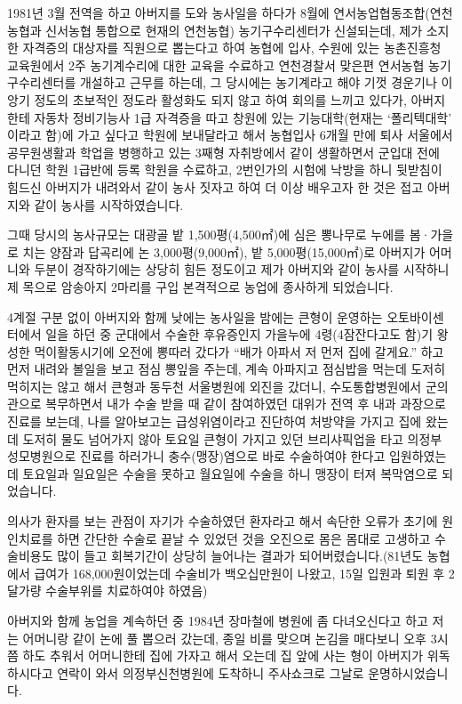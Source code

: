 \documentclass[chapter,book,openany,twoside]{oblivoir}
\begin{document}
1981년 3월 전역을 하고 아버지를 도와 농사일을 하다가 8월에 연서농업협동조합(연천농협과 신서농협 통합으로 현재의 연천농협) 농기구수리센터가 신설되는데, 제가 소지한 자격증의 대상자를 직원으로 뽑는다고 하여 농협에 입사, 수원에 있는 농촌진흥청 교육원에서 2주 농기계수리에 대한 교육을 수료하고 연천경찰서 맞은편 연서농협 농기구수리센터를 개설하고 근무를 하는데, 그 당시에는 농기계라고 해야 기껏 경운기나 이앙기 정도의 초보적인 정도라 활성화도 되지 않고 하여 회의를 느끼고 있다가, 아버지한테 자동차 정비기능사 1급 자격증을 따고 창원에 있는 기능대학(현재는 `폴리텍대학' 이라고 함)에 가고 싶다고 학원에 보내달라고 해서 농협입사 6개월 만에 퇴사 서울에서 공무원생활과 학업을 병행하고 있는 3째형 자취방에서 같이 생활하면서 군입대 전에 다니던 학원 1급반에 등록 학원을 수료하고, 2번인가의 시험에 낙방을 하니 뒷받침이 힘드신 아버지가 내려와서 같이 농사 짓자고 하여 더 이상 배우고자 한 것은 접고 아버지와 같이 농사를 시작하였습니다.

그때 당시의 농사규모는 대광골 밭 1,500평(4,500㎡)에 심은 뽕나무로 누에를 봄·가을로 치는 양잠과 답곡리에 논 3,000평(9,000㎡), 밭 5,000평(15,000㎡)로 아버지가 어머니와 두분이 경작하기에는 상당히 힘든 정도이고 제가 아버지와 같이 농사를 시작하니 제 목으로 암송아지 2마리를 구입 본격적으로 농업에 종사하게 되었습니다.

4계절 구분 없이 아버지와 함께 낮에는 농사일을 밤에는 큰형이 운영하는 오토바이센터에서 일을 하던 중 군대에서 수술한 후유증인지 가을누에 4령(4잠잔다고도 함)기  왕성한 먹이활동시기에 오전에 뽕따러 갔다가 ``배가 아파서 저 먼저 집에 갈게요.'' 하고 먼저 내려와 볼일을 보고 점심 뽕잎을 주는데, 계속 아파지고 점심밥을 먹는데 도저히 먹히지는 않고 해서 큰형과 동두천 서울병원에 외진을 갔더니, 수도통합병원에서 군의관으로 복무하면서 내가 수술 받을 때 같이 참여하였던 대위가 전역 후 내과 과장으로 진료를 보는데, 나를 알아보고는 급성위염이라고 진단하여 처방약을 가지고 집에 왔는데 도저히 물도 넘어가지 않아 토요일 큰형이 가지고 있던 브리샤픽업을 타고 의정부 성모병원으로 진료를 하러가니 충수(맹장)염으로 바로 수술하여야 한다고 입원하였는데 토요일과 일요일은 수술을 못하고 월요일에 수술을 하니 맹장이 터져 복막염으로 되었습니다.

의사가 환자를 보는 관점이 자기가 수술하였던 환자라고 해서 속단한 오류가 초기에 원인치료를 하면 간단한 수술로 끝날 수 있었던 것을 오진으로 몸은 몸대로 고생하고 수술비용도 많이 들고 회복기간이 상당히 늘어나는 결과가 되어버렸습니다.(81년도 농협에서 급여가 168,000원이었는데 수술비가 백오십만원이 나왔고, 15일 입원과 퇴원 후 2달가량 수술부위를 치료하여야 하였음)

아버지와 함께 농업을 계속하던 중 1984년 장마철에 병원에 좀 다녀오신다고 하고 저는 어머니랑 같이 논에 풀 뽑으러 갔는데, 종일 비를 맞으며 논김을 매다보니 오후 3시쯤 하도 추워서 어머니한테 집에 가자고 해서 오는데 집 앞에 사는 형이 아버지가 위독하시다고 연락이 와서 의정부신천병원에 도착하니 주사쇼크로 그날로 운명하시었습니다.
\end{document}
